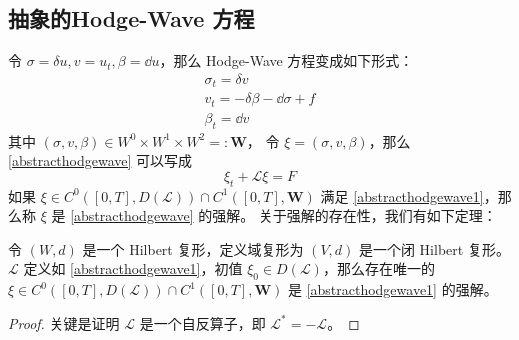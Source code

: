 \documentclass[lang=cn,a4paper,newtx]{elegantpaper}
\begin{document}
\subsection{抽象的Hodge-Wave 方程}
令 $\sigma = \delta u, v = u_t, \beta = \dd u$，那么 Hodge-Wave
方程变成如下形式：
\begin{equation}
    \label{abstracthodgewave}
    \begin{aligned}
        \sigma_t = \delta v\\
        v_t = -\delta \beta - \dd \sigma + f\\
        \beta_t = \dd v
    \end{aligned}
\end{equation}
其中 $(\sigma, v, \beta) \in W^0\times W^1\times W^2 =: \boldsymbol{W}$，
令 $\xi = (\sigma, v, \beta)$，那么 \eqref{abstracthodgewave} 可以写成
\begin{equation}
\label{abstracthodgewave1}
\xi_t + \mathcal{L}\xi = F
\end{equation}
如果 $\xi \in C^0([0, T], D(\mathcal{L}))\cap C^1([0, T], \boldsymbol{W})$ 满足 
\eqref{abstracthodgewave1}，那么称 $\xi$ 是 \eqref{abstracthodgewave} 的强解。
关于强解的存在性，我们有如下定理：
\begin{theorem}
\label{abstracthodgewavetheorem}
    令 $(W, d)$ 是一个 Hilbert 复形，定义域复形为 $(V, d)$ 是一个闭 Hilbert
    复形。$\mathcal{L}$ 定义如 \eqref{abstracthodgewave1}，初值 $\xi_0 \in
    D(\mathcal{L})$，那么存在唯一的 $\xi \in C^0([0, T], D(\mathcal{L}))\cap
    C^1([0, T], \boldsymbol{W})$ 是 \eqref{abstracthodgewave1} 的强解。
\end{theorem}
\begin{proof}
    关键是证明 $\mathcal{L}$ 是一个自反算子，即 $\mathcal{L}^* = -\mathcal{L}$。
\end{proof}
\end{document}

